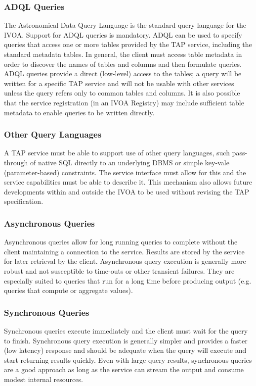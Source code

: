 \documentclass[11pt,letter]{ivoa}
\begin{document}
\subsubsection{ADQL Queries}
The Astronomical Data Query Language \citep{std:ADQL} is the standard 
query language for the IVOA. Support for ADQL queries is mandatory. ADQL can be 
used to specify queries  that access one or more tables provided by the TAP 
service, including the standard metadata tables. In general, the client must 
access table metadata in order to discover the names of tables and columns and 
then formulate queries. ADQL queries provide a direct (low-level) access to the 
tables; a query will be written for a specific TAP service and will not be 
usable with other services unless the query refers only to common tables and 
columns. It is also possible that the service registration (in an IVOA Registry) 
may include sufficient table metadata to enable queries to be written directly.

\subsubsection{Other Query Languages}
A TAP service must be able to support use of other query languages, such
pass-through of native SQL directly to an underlying DBMS or simple key-vale 
(parameter-based) constraints. The service interface must allow for 
this and the service capabilities must be able to describe it. This mechanism 
also allows future developments within and outside the IVOA to be used without 
revising the TAP specification.

\subsubsection{Asynchronous Queries}
Asynchronous queries allow for long running queries to complete without 
the client maintaining a connection to the service. Results are stored by 
the service for later retrieval by the client. Asynchronous query 
execution is generally more robust and not susceptible to time-outs or other 
transient failures. They are especially suited to queries that run for a long 
time before producing output (e.g. queries that compute or aggregate values).

\subsubsection{Synchronous Queries}
Synchronous queries execute immediately  and the client must wait for the query 
to finish. Synchronous query execution is generally simpler and provides a 
faster (low latency) response and should be adequate when the query will execute 
and start returning results quickly. Even with large query results, synchronous 
queries are a good approach as long as the service can stream the output 
and consume modest internal resources. 
\end{document}
